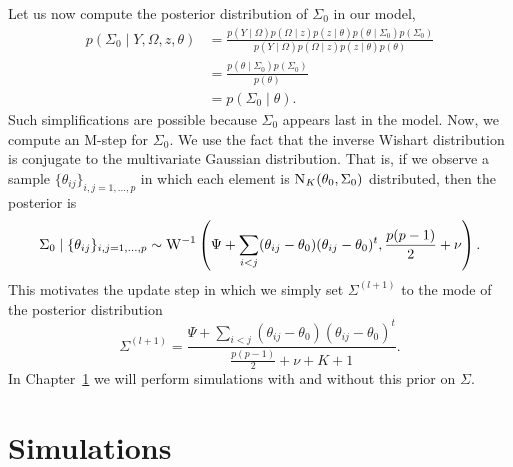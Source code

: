 \documentclass[a4paper, 11pt, oneside]{report}
\newcommand{\1}{\mathds{1}}
\newcommand{\inv}{^{-1}}
\newcommand{\Nor}{\textsc{N}}
\begin{document}
Let us now compute the posterior distribution of $\Sigma_0$ in our model,
\begin{align*}
	p(\Sigma_0 \mid Y, \Omega, z, \theta) & = \frac{p(Y \mid \Omega) p(\Omega \mid z) p(z \mid \theta) p(\theta \mid \Sigma_0) p(\Sigma_0)}{p(Y \mid \Omega) p(\Omega \mid z) p(z \mid \theta) p(\theta)} \\
	                                      & = \frac{p(\theta \mid \Sigma_0) p(\Sigma_0)}{p(\theta)}                                                                                                       \\
	                                      & = p(\Sigma_0 \mid \theta).
\end{align*}
Such simplifications are possible because $\Sigma_0$ appears last in the model.
Now, we compute an M-step for $\Sigma_0$.
We use the fact that the inverse Wishart distribution is conjugate to the multivariate Gaussian distribution.
That is, if we observe a sample $\{\theta_{ij}\}_{i,j=1,\dots,p}$ in which each element
is $\Nor_K (\theta_0, \Sigma_0)$ distributed, then the posterior is
\[\Sigma_0 \mid \{\theta_{ij}\}_{i,j=1,\dots,p} \sim \textsc{W}\inv\left(\Psi + \sum_{i < j} (\theta_{ij} - \theta_0)(\theta_{ij} - \theta_0)^t , \frac{p(p-1)}{2} + \nu\right).\]
This motivates the update step in which we simply set $\Sigma^{(l+1)}$ to the mode of the posterior distribution
\[\Sigma^{(l+1)} = \frac{\Psi + \sum_{i < j} (\theta_{ij} - \theta_0)(\theta_{ij} - \theta_0)^t}{\frac{p(p-1)}{2} + \nu + K + 1}.\]
In Chapter~\ref{chap:simualtions} we will perform simulations with and without this prior on $\Sigma$.


\chapter{Simulations}\label{chap:simualtions}
\end{document}
